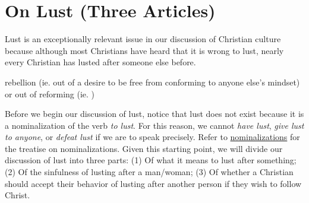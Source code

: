 \documentclass[a4paper, parskip=full, 12pt]{article}
\begin{document}
\section{On Lust (Three Articles)}
Lust is an exceptionally relevant issue in our discussion of Christian culture because although most Christians have heard that it is wrong to lust, nearly every Christian has lusted after someone else before.



rebellion (ie. out of a desire to be free from conforming to anyone else's mindset) or out of reforming (ie. )

Before we begin our discussion of lust, notice that lust does not exist because it is a nominalization of the verb \textit{to lust}. For this reason, we cannot \textit{have lust}, \textit{give lust to anyone}, or \textit{defeat lust} if we are to speak precisely. Refer to \underline{nominalizations} for the treatise on nominalizations. Given this starting point, we will divide our discussion of lust into three parts: (1) Of what it means to lust after something; (2) Of the sinfulness of lusting after a man/woman; (3) Of whether a Christian should accept their behavior of lusting after another person if they wish to follow Christ. \\
\end{document}
